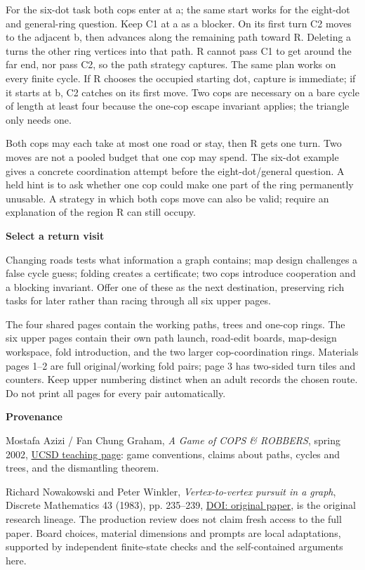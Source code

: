 \documentclass[11pt,letterpaper]{article}
\newcommand{\heading}[1]{\par\vspace{4pt}{\large\bfseries #1}\par}
\newcommand{\sub}[1]{\par\textbf{#1}\par}
\begin{document}
For the six-dot task both cops enter at a; the same start works for the eight-dot and general-ring question. Keep C1 at a as a blocker. On its first turn C2 moves to the adjacent b, then advances along the remaining path toward R. Deleting a turns the other ring vertices into that path. R cannot pass C1 to get around the far end, nor pass C2, so the path strategy captures. The same plan works on every finite cycle. If R chooses the occupied starting dot, capture is immediate; if it starts at b, C2 catches on its first move. Two cops are necessary on a bare cycle of length at least four because the one-cop escape invariant applies; the triangle only needs one.

Both cops may each take at most one road or stay, then R gets one turn. Two moves are not a pooled budget that one cop may spend. The six-dot example gives a concrete coordination attempt before the eight-dot/general question. A held hint is to ask whether one cop could make one part of the ring permanently unusable. A strategy in which both cops move can also be valid; require an explanation of the region R can still occupy.

\sub{Select a return visit}
Changing roads tests what information a graph contains; map design challenges a false cycle guess; folding creates a certificate; two cops introduce cooperation and a blocking invariant. Offer one of these as the next destination, preserving rich tasks for later rather than racing through all six upper pages.
\newpage
\heading{Print map, sources and use record}
The four shared pages contain the working paths, trees and one-cop rings. The six upper pages contain their own path launch, road-edit boards, map-design workspace, fold introduction, and the two larger cop-coordination rings. Materials pages 1--2 are full original/working fold pairs; page 3 has two-sided turn tiles and counters. Keep upper numbering distinct when an adult records the chosen route. Do not print all pages for every pair automatically.

\sub{Provenance}
Mostafa Azizi / Fan Chung Graham, \emph{A Game of COPS \& ROBBERS}, spring 2002, \href{https://fanchung.ucsd.edu/152/arch/coprob/}{UCSD teaching page}: game conventions, claims about paths, cycles and trees, and the dismantling theorem.

Richard Nowakowski and Peter Winkler, \emph{Vertex-to-vertex pursuit in a graph}, Discrete Mathematics 43 (1983), pp. 235--239, \href{https://doi.org/10.1016/0012-365X(83)90160-7}{DOI: original paper}, is the original research lineage. The production review does not claim fresh access to the full paper. Board choices, material dimensions and prompts are local adaptations, supported by independent finite-state checks and the self-contained arguments here.
\end{document}
